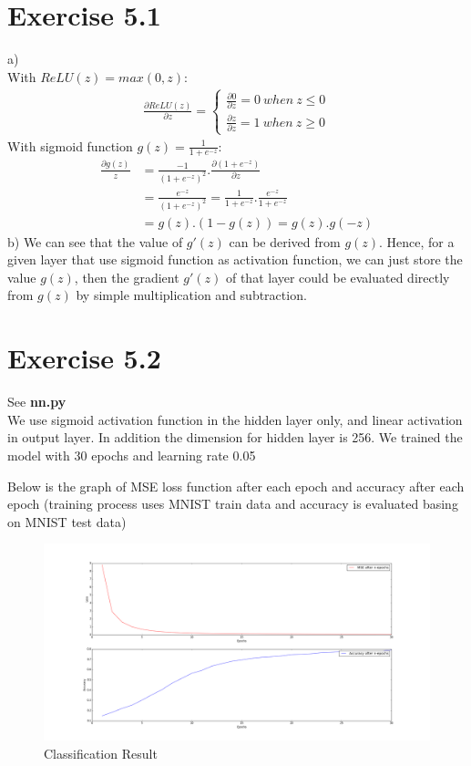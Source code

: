 \documentclass{article}
\begin{document}
\section*{Exercise 5.1}
a)\\
With $ReLU(z) = max(0,z)$:
\begin{align*}
\frac{\partial ReLU(z)}{\partial z} = 
\begin{cases}
\frac{\partial 0}{\partial z} = 0\ when\ z \leq 0\\
\frac{\partial z}{\partial z} = 1\ when\ z \geq 0
\end{cases}
\end{align*}
With sigmoid function $g(z) = \frac{1}{1+e^{-z}}$:
\begin{align*}
\frac{\partial g(z)}{z} &= \frac{-1}{(1 + e^{-z})^2}. \frac{\partial (1 + e^{-z})}{\partial z}\\
&= \frac{e^{-z}}{(1 + e^{-z})^2} = \frac{1}{1 + e^{-z}}.\frac{e^{-z}}{1 + e^{-z}}\\
&=g(z).(1-g(z)) = g(z).g(-z)
\end{align*}
b)
We can see that the value of $g'(z)$ can be derived from $g(z)$. Hence, for a given layer that use sigmoid function as activation function, we can just store the value $g(z)$, then the gradient $g'(z)$ of that layer could be evaluated directly from $g(z)$ by simple multiplication and subtraction.
\section*{Exercise 5.2}
See \textbf{nn.py}\\
We use sigmoid activation function in the hidden layer only, and linear activation in output layer. In addition the dimension for hidden layer is 256. We trained the model with 30 epochs and learning rate 0.05

Below is the graph of MSE loss function after each epoch and accuracy after each epoch (training process uses MNIST train data and accuracy is evaluated basing on MNIST test data)

\begin{figure}[H]
	\centering
	\includegraphics[scale=0.3]{nn.png}
	\caption{Classification Result}
	\label{fig3}	
\end{figure}
\end{document}
